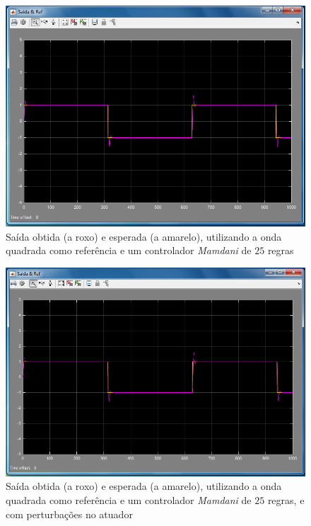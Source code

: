 \documentclass{article}
\begin{document}
\begin{figure}[h]
  \centering
      \includegraphics[scale=0.3]{Images/Mamdani_25_square.png}
  \caption{Saída obtida (a roxo) e esperada (a amarelo), utilizando a onda quadrada como referência e um controlador \emph{Mamdani} de $25$ regras}
\end{figure}

\begin{figure}[h]
  \centering
      \includegraphics[scale=0.3]{Images/Mamdani_25_square_actuator.png}
  \caption{Saída obtida (a roxo) e esperada (a amarelo), utilizando a onda quadrada como referência e um controlador \emph{Mamdani} de $25$ regras, e com perturbações no atuador}
\end{figure}
\end{document}
